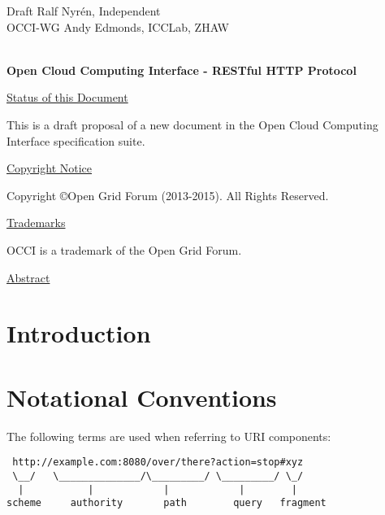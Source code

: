 \documentclass[10pt,a4paper]{article}
\begin{document}
\thispagestyle{empty}

Draft \hfill Ralf Nyrén, Independent \\
OCCI-WG \hfill Andy Edmonds, ICCLab, ZHAW \\
\\

\vspace*{0.5in}

\begin{Large}
\textbf{Open Cloud Computing Interface - RESTful HTTP Protocol}
\end{Large}

\vspace*{0.5in}

\underline{Status of this Document}

%
This is a draft proposal of a new document in the Open Cloud Computing
Interface specification suite.

\underline{Copyright Notice}

Copyright \copyright Open Grid Forum (2013-2015). All Rights Reserved.

\underline{Trademarks}

OCCI is a trademark of the Open Grid Forum.

\underline{Abstract}




\newpage
\tableofcontents
\newpage

\section{Introduction}
%

\section{Notational Conventions}


The following terms \cite{rfc3986} are used when referring to URI
components:

\begin{verbatim}
 http://example.com:8080/over/there?action=stop#xyz
 \__/   \______________/\_________/ \_________/ \_/
  |           |            |            |        |
scheme     authority       path        query   fragment
\end{verbatim}
\end{document}
